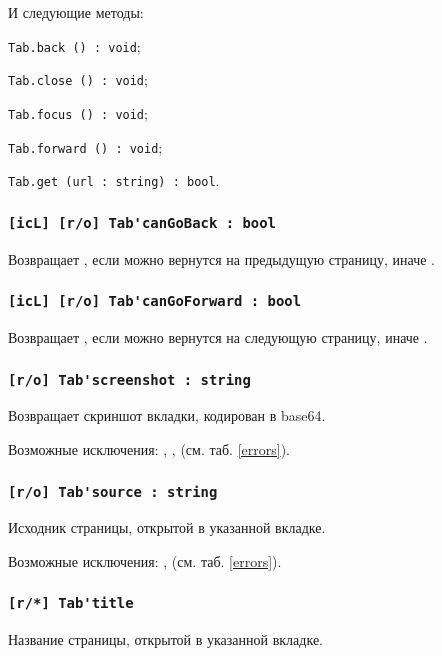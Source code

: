 И следующие методы:
\begin{icItems}
	\item \lstinline|Tab.back () : void|;
	\item \lstinline|Tab.close () : void|;
	\item \lstinline|Tab.focus () : void|;
	\item \lstinline|Tab.forward () : void|;
	\item \lstinline|Tab.get (url : string) : bool|.
\end{icItems}

\subsubsection{\lstinline|[icL] [r/o] Tab'canGoBack : bool|}

Возвращает \true, если можно вернутся на предыдущую страницу, иначе \false.

\subsubsection{\lstinline|[icL] [r/o] Tab'canGoForward : bool|}

Возвращает \true, если можно вернутся на следующую страницу, иначе \false.

\subsubsection{\lstinline|[r/o] Tab'screenshot : string|}

Возвращает скриншот вкладки, кодирован в base64.

Возможные исключения: , ,  (см. таб. \ref{errors}).

\subsubsection{\lstinline|[r/o] Tab'source : string|}

Исходник страницы, открытой в указанной вкладке.

Возможные исключения: ,  (см. таб. \ref{errors}).

\subsubsection{\lstinline|[r/*] Tab'title|}

Название страницы, открытой в указанной вкладке.

